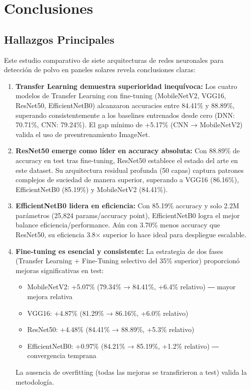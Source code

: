 \documentclass[11pt, a4paper]{article}
\begin{document}
\section{Conclusiones}

\subsection{Hallazgos Principales}

Este estudio comparativo de siete arquitecturas de redes neuronales para detección de polvo en paneles solares revela conclusiones claras:

\begin{enumerate}
    \item \textbf{Transfer Learning demuestra superioridad inequívoca:} Los cuatro modelos de Transfer Learning con fine-tuning (MobileNetV2, VGG16, ResNet50, EfficientNetB0) alcanzaron accuracies entre 84.41\% y 88.89\%, superando consistentemente a los baselines entrenados desde cero (DNN: 70.71\%, CNN: 79.24\%). El gap mínimo de +5.17\% (CNN → MobileNetV2) valida el uso de preentrenamiento ImageNet.
    
    \item \textbf{ResNet50 emerge como líder en accuracy absoluta:} Con 88.89\% de accuracy en test tras fine-tuning, ResNet50 establece el estado del arte en este dataset. Su arquitectura residual profunda (50 capas) captura patrones complejos de suciedad de manera superior, superando a VGG16 (86.16\%), EfficientNetB0 (85.19\%) y MobileNetV2 (84.41\%).
    
    \item \textbf{EfficientNetB0 lidera en eficiencia:} Con 85.19\% accuracy y solo 2.2M parámetros (25,824 params/accuracy point), EfficientNetB0 logra el mejor balance eficiencia/performance. Aún con 3.70\% menos accuracy que ResNet50, su eficiencia 3.8× superior lo hace ideal para despliegue escalable.
    
    \item \textbf{Fine-tuning es esencial y consistente:} La estrategia de dos fases (Transfer Learning + Fine-Tuning selectivo del 35\% superior) proporcionó mejoras significativas en test:
    \begin{itemize}
        \item MobileNetV2: +5.07\% (79.34\% → 84.41\%, +6.4\% relativo) ― mayor mejora relativa
        \item VGG16: +4.87\% (81.29\% → 86.16\%, +6.0\% relativo)
        \item ResNet50: +4.48\% (84.41\% → 88.89\%, +5.3\% relativo)
        \item EfficientNetB0: +0.97\% (84.21\% → 85.19\%, +1.2\% relativo) ― convergencia temprana
    \end{itemize}
    La ausencia de overfitting (todas las mejoras se transfirieron a test) valida la metodología.
    

\end{enumerate}
\end{document}
